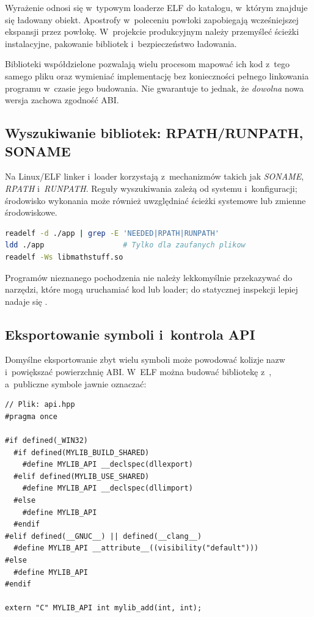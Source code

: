Wyrażenie  odnosi się w~typowym loaderze ELF do
katalogu, w~którym znajduje się ładowany obiekt. Apostrofy w~poleceniu
powłoki zapobiegają wcześniejszej ekspansji  przez
powłokę. W~projekcie produkcyjnym należy przemyśleć ścieżki
instalacyjne, pakowanie bibliotek i~bezpieczeństwo ładowania.

Biblioteki współdzielone pozwalają wielu procesom mapować ich kod
z~tego samego pliku oraz wymieniać implementację bez konieczności
pełnego linkowania programu w~czasie jego budowania. Nie gwarantuje
to jednak, że \emph{dowolna} nowa wersja zachowa zgodność ABI.

\subsection{Wyszukiwanie bibliotek: RPATH/RUNPATH, SONAME}

Na Linux/ELF linker i~loader korzystają z~mechanizmów takich jak
\emph{SONAME}, \emph{RPATH} i~\emph{RUNPATH}. Reguły wyszukiwania
zależą od systemu i~konfiguracji; środowisko wykonania może również
uwzględniać ścieżki systemowe lub zmienne środowiskowe.

\begin{lstlisting}[language=bash,caption={Diagnostyka zaleznosci dynamicznych (Linux).}]
readelf -d ./app | grep -E 'NEEDED|RPATH|RUNPATH'
ldd ./app                  # Tylko dla zaufanych plikow
readelf -Ws libmathstuff.so
\end{lstlisting}

Programów nieznanego pochodzenia nie należy lekkomyślnie przekazywać
do narzędzi, które mogą uruchamiać kod lub loader; do statycznej
inspekcji lepiej nadaje się .

\subsection{Eksportowanie symboli i~kontrola API}

Domyślne eksportowanie zbyt wielu symboli może powodować kolizje
nazw i~powiększać powierzchnię ABI. W~ELF można budować bibliotekę
z~, a~publiczne symbole jawnie oznaczać:

\begin{lstlisting}[caption={Przenosne w granicach GCC/Clang/MSVC makro eksportu.}]
// Plik: api.hpp
#pragma once

#if defined(_WIN32)
  #if defined(MYLIB_BUILD_SHARED)
    #define MYLIB_API __declspec(dllexport)
  #elif defined(MYLIB_USE_SHARED)
    #define MYLIB_API __declspec(dllimport)
  #else
    #define MYLIB_API
  #endif
#elif defined(__GNUC__) || defined(__clang__)
  #define MYLIB_API __attribute__((visibility("default")))
#else
  #define MYLIB_API
#endif

extern "C" MYLIB_API int mylib_add(int, int);
\end{lstlisting}

